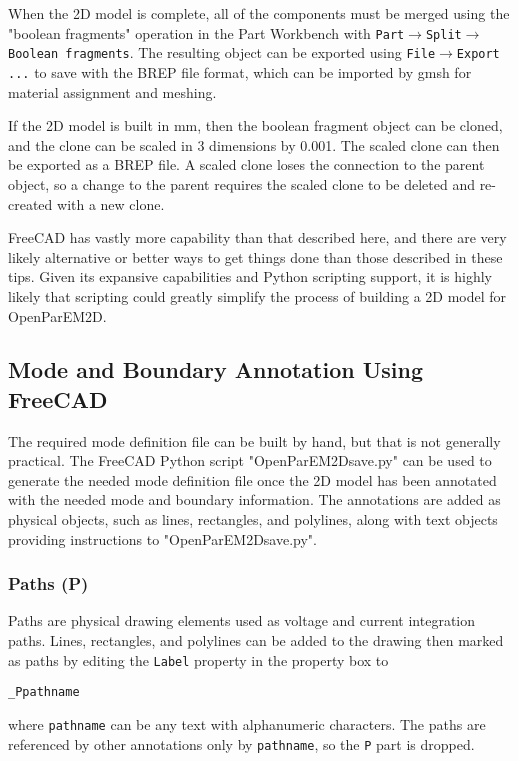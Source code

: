\documentclass[titlepage]{article}
\renewcommand\_{\textunderscore\linebreak[1]}
\begin{document}
When the 2D model is complete, all of the components must be merged using the "boolean fragments" operation in the Part Workbench with \texttt{Part}$\rightarrow$\texttt{Split}$\rightarrow$\texttt{Boolean fragments}.  The resulting object can be exported using \texttt{File}$\rightarrow$\texttt{Export ...} to save with the BREP file format, which can be imported by gmsh for material assignment and meshing. 

If the 2D model is built in mm, then the boolean fragment object can be cloned, and the clone can be scaled in 3 dimensions by 0.001.  The scaled clone can then be exported as a BREP file.  A scaled clone loses the connection to the parent object, so a change to the parent requires the scaled clone to be deleted and re-created with a new clone.

FreeCAD has vastly more capability than that described here, and there are very likely alternative or better ways to get things done than those described in these tips.  Given its expansive capabilities and Python scripting support, it is highly likely that scripting could greatly simplify the process of building a 2D model for OpenParEM2D.

\subsection{Mode and Boundary Annotation Using FreeCAD}

The required mode definition file can be built by hand, but that is not generally practical.  The FreeCAD Python script "OpenParEM2D\_save.py" can be used to generate the needed mode definition file once the 2D model has been annotated with the needed mode and boundary information.  The annotations are added as physical objects, such as lines, rectangles, and polylines, along with text objects providing instructions to "OpenParEM2D\_save.py". 

\subsubsection{Paths (\_P)}
\label{sec:paths}

Paths are physical drawing elements used as voltage and current integration paths.  Lines, rectangles, and polylines can be added to the drawing then marked as paths by editing the \texttt{Label} property in the property box to
\begin{Verbatim}[fontsize=\small]
  _Ppathname
\end{Verbatim}
\noindent where \texttt{pathname} can be any text with alphanumeric characters.  The paths are referenced by other annotations only by \texttt{pathname}, so the \texttt{\_P} part is dropped.
\end{document}
